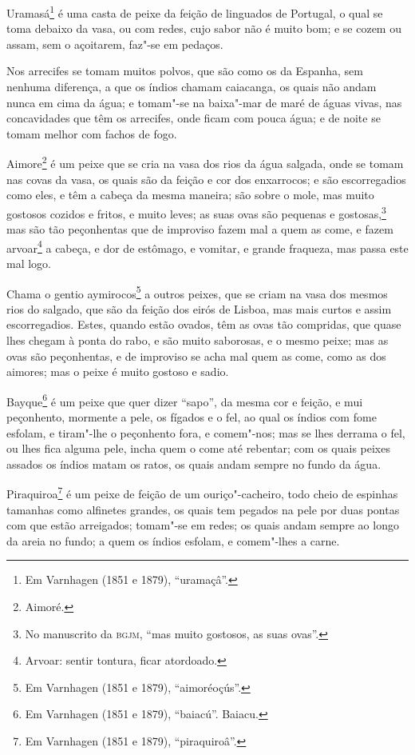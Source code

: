 Uramasá\footnote{ Em Varnhagen (1851 e 1879), ``uramaçâ''.} é uma casta de peixe da feição
de linguados de Portugal, o qual se toma debaixo da vasa, ou com redes, cujo sabor não é
muito bom; e se cozem ou assam, sem o açoitarem, faz"-se em pedaços.

Nos arrecifes se tomam muitos polvos, que são como os da Espanha, sem nenhuma diferença, a
que os índios chamam caiacanga, os quais não andam nunca em cima da água; e tomam"-se na
baixa"-mar de maré de águas vivas, nas concavidades que têm os arrecifes, onde ficam com
pouca água; e de noite se tomam melhor com fachos de fogo.

Aimore\footnote{ Aimoré.} é um peixe que se cria na vasa dos rios da água salgada, onde se
tomam nas covas da vasa, os quais são da feição e cor dos enxarrocos; e são escorregadios
como eles, e têm a cabeça da mesma maneira; são sobre o mole, mas muito gostosos cozidos e
fritos, e muito leves; as suas ovas são pequenas e gostosas,\footnote{ No manuscrito da
\textsc{bgjm}, ``mas muito gostosos, as suas ovas''.} mas são tão peçonhentas que de
improviso fazem mal a quem as come, e fazem arvoar\footnote{ Arvoar: sentir tontura, ficar
atordoado.} a cabeça, e dor de estômago, e vomitar, e grande fraqueza, mas
passa este mal logo.

Chama o gentio aymirocos\footnote{ Em Varnhagen (1851 e 1879), ``aimoréoçús''.} a outros
peixes, que se criam na vasa dos mesmos rios do salgado, que são da feição dos eirós de
Lisboa, mas mais curtos e assim escorregadios. Estes, quando estão ovados, têm as ovas tão
compridas, que quase lhes chegam à ponta do rabo, e são muito saborosas, e o mesmo peixe;
mas as ovas são peçonhentas, e de improviso se acha mal quem as come, como as dos aimores;
mas o peixe é muito gostoso e sadio.

Bayque\footnote{ Em Varnhagen (1851 e 1879), ``baiacú''. Baiacu.} é um peixe que quer
dizer ``sapo'', da mesma cor e feição, e mui peçonhento, mormente a pele, os fígados e o
fel, ao qual os índios com fome esfolam, e tiram"-lhe o peçonhento fora, e comem"-nos; mas
se lhes derrama o fel, ou lhes fica alguma pele, incha quem o come até rebentar; com os
quais peixes assados os índios matam os ratos, os quais andam sempre no fundo da água.

Piraquiroa\footnote{ Em Varnhagen (1851 e 1879), ``piraquiroâ''.} é um peixe de feição de
um ouriço"-cacheiro, todo cheio de espinhas tamanhas como alfinetes grandes, os quais tem
pegados na pele por duas pontas com que estão arreigados; tomam"-se em redes; os quais
andam sempre ao longo da areia no fundo; a quem os índios esfolam, e comem"-lhes a carne.

